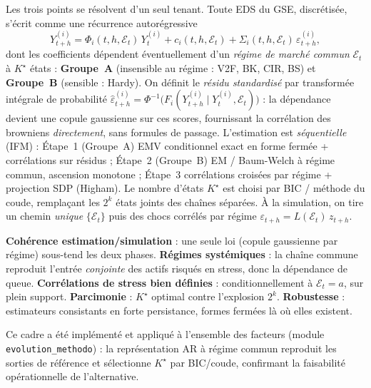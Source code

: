 \documentclass[11pt,a4paper]{article}
\begin{document}
Les trois points se résolvent d'un seul tenant. Toute EDS du GSE, discrétisée, s'écrit comme une récurrence autorégressive
\begin{equation*}
Y^{(i)}_{t+h}=\Phi_i(t,h,\mathcal{E}_t)\,Y^{(i)}_t+c_i(t,h,\mathcal{E}_t)+\Sigma_i(t,h,\mathcal{E}_t)\,\varepsilon^{(i)}_{t+h},
\end{equation*}
dont les coefficients dépendent éventuellement d'un \emph{régime de marché commun} $\mathcal{E}_t$ à $K^\star$ états : \textbf{Groupe~A} (insensible au régime : V2F, BK, CIR, BS) et \textbf{Groupe~B} (sensible : Hardy). On définit le \emph{résidu standardisé} par transformée intégrale de probabilité $\widehat\varepsilon^{(i)}_{t+h}=\Phi^{-1}\!\big(F_i(Y^{(i)}_{t+h}\mid Y^{(i)}_t,\mathcal{E}_t)\big)$ : la dépendance devient une copule gaussienne sur ces scores, fournissant la corrélation des browniens \emph{directement}, sans formules de passage. L'estimation est \emph{séquentielle} (IFM) : Étape~1 (Groupe~A) EMV conditionnel exact en forme fermée + corrélations sur résidus ; Étape~2 (Groupe~B) EM / Baum-Welch à régime commun, ascension monotone ; Étape~3 corrélations croisées par régime + projection SDP (Higham). Le nombre d'états $K^\star$ est choisi par BIC / méthode du coude, remplaçant les $2^k$ états joints des chaînes séparées. À la simulation, on tire un chemin \emph{unique} $\{\mathcal{E}_t\}$ puis des chocs corrélés par régime $\varepsilon_{t+h}=L(\mathcal{E}_t)\,z_{t+h}$.

\begin{mabox}
\textbf{Cohérence estimation/simulation} : une seule loi (copule gaussienne par régime) sous-tend les deux phases. \textbf{Régimes systémiques} : la chaîne commune reproduit l'entrée \emph{conjointe} des actifs risqués en stress, donc la dépendance de queue. \textbf{Corrélations de stress bien définies} : conditionnellement à $\mathcal{E}_t=a$, sur plein support. \textbf{Parcimonie} : $K^\star$ optimal contre l'explosion $2^k$. \textbf{Robustesse} : estimateurs consistants en forte persistance, formes fermées là où elles existent.
\end{mabox}

Ce cadre a été implémenté et appliqué à l'ensemble des facteurs (module \texttt{evolution\_methodo}) : la représentation AR à régime commun reproduit les sorties de référence et sélectionne $K^\star$ par BIC/coude, confirmant la faisabilité opérationnelle de l'alternative.
\end{document}
